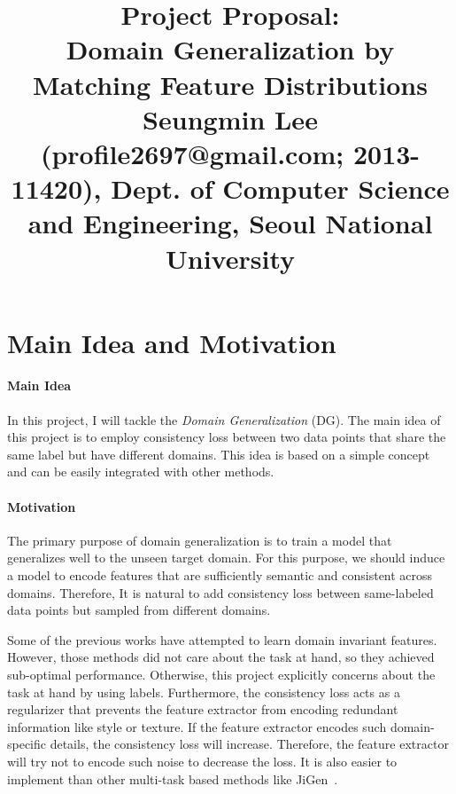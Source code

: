 \documentclass[10pt,twocolumn,letterpaper]{article}
\begin{document}
\title{Project Proposal: \\ Domain Generalization by Matching Feature Distributions \\{\rm {\normalsize Seungmin Lee (profile2697@gmail.com; 2013-11420), Dept. of Computer Science and Engineering, Seoul National University}}} 

\maketitle
\thispagestyle{empty}


\section{Main Idea and Motivation}
\paragraph{Main Idea}  In this project, I will tackle the \textit{Domain Generalization} (DG). The main idea of this project is to employ consistency loss between two data points that share the same label but have different domains. This idea is based on a simple concept and can be easily integrated with other methods.

\paragraph{Motivation}
The primary purpose of domain generalization is to train a model that generalizes well to the unseen target domain. For this purpose, we should induce a model to encode features that are sufficiently semantic and consistent across domains. Therefore, It is natural to add consistency loss between same-labeled data points but sampled from different domains. 

Some of the previous works have attempted to learn domain invariant features. However, those methods did not care about the task at hand, so they achieved sub-optimal performance. Otherwise, this project explicitly concerns about the task at hand by using labels. Furthermore, the consistency loss acts as a regularizer that prevents the feature extractor from encoding redundant information like style or texture. If the feature extractor encodes such domain-specific details, the consistency loss will increase. Therefore, the feature extractor will try not to encode such noise to decrease the loss. It is also easier to implement than other multi-task based methods like JiGen~\cite{JiGen}.
\end{document}
